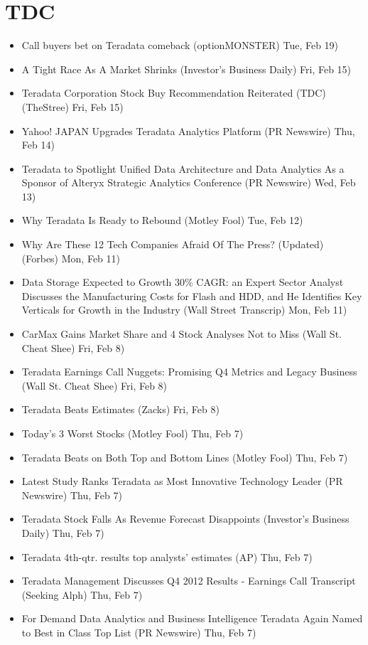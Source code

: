 \documentclass[11pt,asymmetric]{article}
\begin{document}
\section*{TDC}
\begin{itemize}
\item Call buyers bet on Teradata comeback (optionMONSTER) Tue, Feb 19)
\item A Tight Race As A Market Shrinks (Investor's Business Daily) Fri, Feb 15)
\item Teradata Corporation Stock Buy Recommendation Reiterated (TDC) (TheStree) Fri, Feb 15)
\item Yahoo! JAPAN Upgrades Teradata Analytics Platform (PR Newswire) Thu, Feb 14)
\item Teradata to Spotlight Unified Data Architecture and Data Analytics As a Sponsor of Alteryx Strategic Analytics Conference (PR Newswire) Wed, Feb 13)
\item Why Teradata Is Ready to Rebound (Motley Fool) Tue, Feb 12)
\item Why Are These 12 Tech Companies Afraid Of The Press? (Updated) (Forbes) Mon, Feb 11)
\item Data Storage Expected to Growth 30\% CAGR: an Expert Sector Analyst Discusses the Manufacturing Costs for Flash and HDD, and He Identifies Key Verticals for Growth in the Industry (Wall Street Transcrip) Mon, Feb 11)
\item CarMax Gains Market Share and 4 Stock Analyses Not to Miss (Wall St. Cheat Shee) Fri, Feb 8)
\item Teradata Earnings Call Nuggets: Promising Q4 Metrics and Legacy Business (Wall St. Cheat Shee) Fri, Feb 8)
\item Teradata Beats Estimates (Zacks) Fri, Feb 8)
\item Today's 3 Worst Stocks (Motley Fool) Thu, Feb 7)
\item Teradata Beats on Both Top and Bottom Lines (Motley Fool) Thu, Feb 7)
\item Latest Study Ranks Teradata as Most Innovative Technology Leader (PR Newswire) Thu, Feb 7)
\item Teradata Stock Falls As Revenue Forecast Disappoints (Investor's Business Daily) Thu, Feb 7)
\item Teradata 4th-qtr. results top analysts' estimates (AP) Thu, Feb 7)
\item Teradata Management Discusses Q4 2012 Results - Earnings Call Transcript (Seeking Alph) Thu, Feb 7)
\item For Demand Data Analytics and Business Intelligence Teradata Again Named to Best in Class Top List (PR Newswire) Thu, Feb 7)

\end{itemize}
\end{document}
